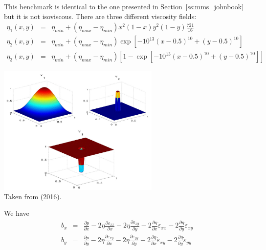 This benchmark is identical to the one presented in Section~\ref{ss:mms_johnbook}
but it is not isoviscous. 
There are three different viscosity fields:
\begin{eqnarray}
\eta_1(x,y) &=& \eta_{min}+(\eta_{max}-\eta_{min})
x^2 (1-x)y^2(1-y)\frac{721}{16} \\
\eta_2(x,y) &=& \eta_{min}+(\eta_{max}-\eta_{min})
\exp [  -10^{13} (x-0.5)^{10} + (y-0.5)^{10}  ] \\
\eta_3(x,y) &=& \eta_{min}+(\eta_{max}-\eta_{min})
\left[1-\exp [  -10^{13} (x-0.5)^{10} + (y-0.5)^{10}  ]\right] 
\end{eqnarray}

\begin{center}
\includegraphics[width=8cm]{images/mms/mms_jokn16b}\\
{\captionfont Taken from \textcite{jokn16b} (2016).}
\end{center}

We have 
\begin{eqnarray}
b_x &=&
\frac{\partial p}{\partial x} 
-2\eta\frac{\partial \dot{\varepsilon}_{xx}}{\partial x}  
-2\eta\frac{\partial \dot{\varepsilon}_{xy}}{\partial y}  
-2 \frac{\partial \eta}{\partial x} \dot{\varepsilon}_{xx}
-2 \frac{\partial \eta}{\partial y} \dot{\varepsilon}_{xy}
\\
b_y &=&
\frac{\partial p}{\partial y} 
-2\eta\frac{\partial \dot{\varepsilon}_{xy}}{\partial x}  
-2\eta\frac{\partial \dot{\varepsilon}_{yy}}{\partial y}  
-2 \frac{\partial \eta}{\partial x} \dot{\varepsilon}_{xy}
-2 \frac{\partial \eta}{\partial y} \dot{\varepsilon}_{yy}
\end{eqnarray}

